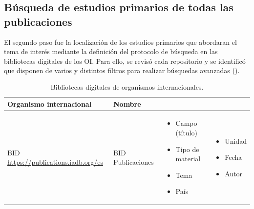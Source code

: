     
 
\subsection{Búsqueda de estudios primarios de todas las publicaciones}\label{sub-sec-busqueda-de-estudios-primarios}

El segundo paso fue la localización de los estudios primarios que
abordaran el tema de interés mediante la definición del protocolo de
búsqueda en las bibliotecas digitales de los OI. Para ello, se revisó
cada repositorio y se identificó que disponen de varios y distintos filtros para realizar búsquedas avanzadas ().

\begin{table}[htpb]
\centering
\footnotesize
\begin{threeparttable}
\caption{Bibliotecas digitales de organismos internacionales.}
\label{tab-01} 
\begin{tabular}{
>{\raggedright\arraybackslash}p{}
>{\raggedright\arraybackslash}p{}
>{\raggedright\arraybackslash}p{}
>{\raggedright\arraybackslash}p{}}
    \toprule
    Organismo internacional & Nombre & \multicolumn{2}{l}{Tipos de filtros en búsquedas avanzadas} \\ 
    \midrule
    BID \url{https://publications.iadb.org/es} &
    BID Publicaciones &
        \begin{itemize}[leftmargin=*, nosep]
            \item Campo (título)
            \item Tipo de material
            \item Tema
            \item País
        \end{itemize}
     &
        \begin{itemize}[leftmargin=*, nosep]
            \item Unidad
            \item Fecha
            \item Autor
        \end{itemize}
     \\ 


\end{tabular}
\end{threeparttable}
\end{table}
